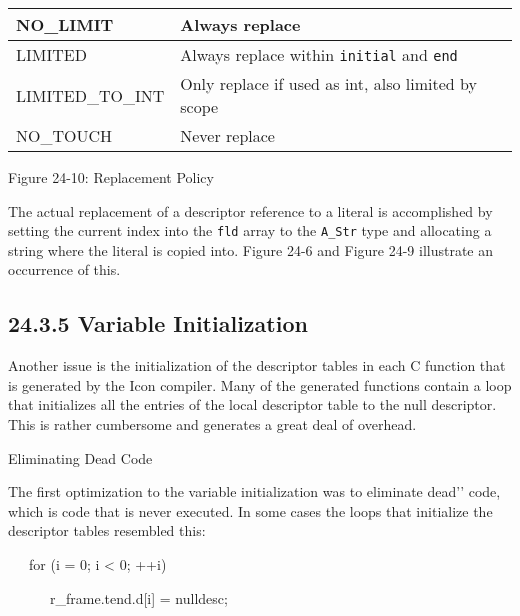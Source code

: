 \begin{center}
\tabletail{}
\tablelasttail{}
\begin{xtabular}{|m{1.4670599in}|m{3.2670598in}|}
\hline
{\ttfamily NO\_LIMIT} &
 Always replace\\\hline
{\ttfamily LIMITED} &
 Always replace within \texttt{initial} and \texttt{end}\\\hline
{\ttfamily LIMITED\_TO\_INT} &
 Only replace if used as int, also limited by scope\\\hline
{\ttfamily NO\_TOUCH} &
 Never replace\\\hline
\end{xtabular}
\end{center}
{\centering{}
Figure 24-10: Replacement Policy
\par}


The actual replacement of a descriptor reference to a literal is
accomplished by setting the current index into the \texttt{fld} array
to the \texttt{A\_Str} type and allocating a string where the literal
is copied into. Figure 24-6 and Figure 24-9 illustrate an occurrence
of this.

\subsection[24.3.5 Variable Initialization]{24.3.5 Variable Initialization}

Another issue is the initialization of the descriptor tables in each C
function that is generated by the Icon compiler.  Many of the
generated functions contain a loop that initializes all the entries of
the local descriptor table to the null descriptor. This is rather
cumbersome and generates a great deal of overhead.

{\sffamily
Eliminating Dead Code}


The first optimization to the variable initialization was to eliminate
{\textasciigrave}{\textasciigrave}dead'{}' code, which is code that is
never executed. In some cases the loops that initialize the
descriptor tables resembled this:

{\ttfamily\mdseries
\ \ \ for (i = 0; i {\textless} 0; ++i)}

{\ttfamily\mdseries
\ \ \ \ \ \ r\_frame.tend.d[i] = nulldesc;}


